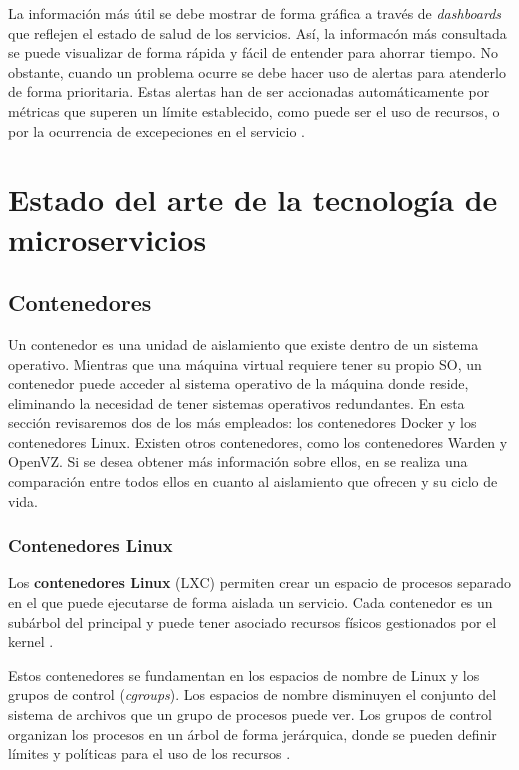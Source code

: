 \documentclass[11pt,spanish,listoffigures]{tfgetsinf}
\begin{document}
La información más útil se debe mostrar de forma gráfica a través de \textit{dashboards} que reflejen el estado de salud de los servicios. Así, la informacón más consultada se puede visualizar de forma rápida y fácil de entender para ahorrar tiempo. No obstante, cuando un problema ocurre se debe hacer uso de alertas para atenderlo de forma prioritaria. Estas alertas han de ser accionadas automáticamente por métricas que superen un límite establecido, como puede ser el uso de recursos, o por la ocurrencia de excepeciones en el servicio \cite{FowlerSusan}. 

%

\chapter{Estado del arte de la tecnología de microservicios}

\section{Contenedores}

Un contenedor \cite{Hunter2017} es una unidad de aislamiento que existe dentro de un sistema operativo. Mientras que una máquina virtual requiere tener su propio SO, un contenedor puede acceder al sistema operativo de la máquina donde reside, eliminando la necesidad de tener sistemas operativos redundantes. En esta sección revisaremos dos de los más empleados: los contenedores Docker y los contenedores Linux. Existen otros contenedores, como los contenedores Warden y OpenVZ. Si se desea obtener más información sobre ellos, en \cite{Dua2014} se realiza una comparación entre todos ellos en cuanto al aislamiento que ofrecen y su ciclo de vida.

\subsection{Contenedores Linux}

Los \textbf{contenedores Linux} (LXC) \cite{Amaral2016} permiten crear un espacio de procesos separado en el que puede ejecutarse de forma aislada un servicio. Cada contenedor es un subárbol del principal y puede tener asociado recursos físicos gestionados por el kernel \cite{Newman2015a}.

Estos contenedores se fundamentan en los espacios de nombre de Linux y los grupos de control (\textit{cgroups}). Los espacios de nombre disminuyen el conjunto del sistema de archivos que un grupo de procesos puede ver. Los grupos de control organizan los procesos en un árbol de forma jerárquica, donde se pueden definir límites y políticas para el uso de los recursos \cite{Amaral2016}.
\end{document}
